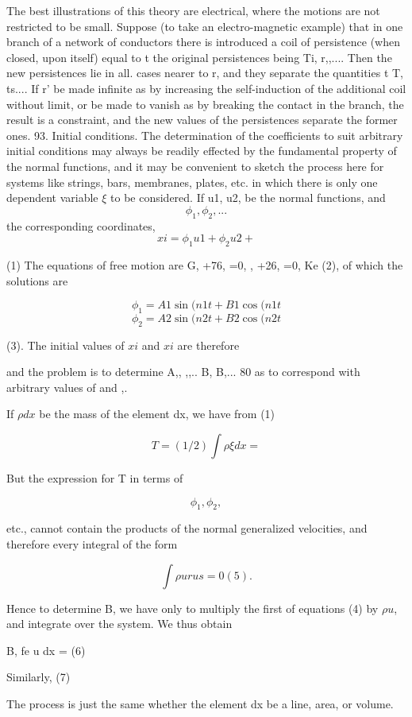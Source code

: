 The best illustrations of this theory are electrical, where the
motions are not restricted to be small. Suppose
(to take an electro-magnetic example) that in one branch of a network of
conductors there is introduced a coil of persistence (when closed,
upon itself) equal to t the original persistences being Ti, r,,....
Then the new persistences lie in all. cases nearer to r, and they
separate the quantities t T, ts.... If r' be made infinite as by
increasing the self-induction of the additional coil without limit,
or be made to vanish as by breaking the contact in the branch,
the result is a constraint, and the new values of the persistences
separate the former ones.
93.  Initial conditions.  The determination of the coefficients to suit
arbitrary initial conditions
may always be readily effected by the fundamental property of the normal
functions, and it may be convenient to sketch the process here for systems like
strings, bars, membranes, plates, etc. in which there is only one dependent
variable \(\xi\) to be considered. If u1, u2, be the normal functions, and
\[\phi_1,\phi_2, ...\]
the corresponding coordinates,
\[xi =\phi_1 u1 +\phi_2 u2 +\]

(1) The equations of free motion are G, +76, =0, , +26, =0, Ke (2), of which
the solutions are

\[\phi_1 = A1 \sin(n1 t + B1 \cos(n1 t\]
\[\phi_2 = A2 \sin(n2 t + B2 \cos(n2 t\]

(3). The initial values of \(xi\) and \(xi\) are therefore

and the problem is to determine A,, ,,.. B, B,... 80 as to correspond with
arbitrary values of and ,.

If \(\rho dx\) be the mass of the element dx, we have from (1)

\[T= (1/2) \int \rho \xi dx  =\]

But the expression for T in terms of

\[\phi_1,\phi_2,\]

etc., cannot contain the products of the normal generalized velocities, and
therefore every integral of the form

\[\int  \rho u r  u s  = 0 (5).\]

Hence to determine B, we have only to multiply the first of equations (4) by
\(\rho u\), and integrate over the system. We thus obtain

B, fe u dx = (6)

Similarly, (7)

The process is just the same whether the element dx be a line, area, or volume.

